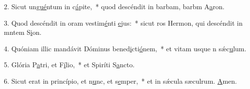 2. Sicut un\uline{gué}ntum in c\uline{á}pite,~* quod descéndit in barbam, barbm A\uline{a}ron.\par 
3. Quod descéndit in oram vestim\uline{é}nti \uline{e}jus:~* sicut ros Hermon, qui descéndit in mntem S\uline{i}on.\par 
4. Quóniam illic mandávit Dóminus bened\uline{i}cti\uline{ó}nem,~* et vitam usque n sǽc\uline{u}lum.\par 
5. Glória P\uline{a}tri, et F\uline{í}lio,~* et Spiríti S\uline{a}ncto.\par 
6. Sicut erat in princípio, et n\uline{u}nc, et s\uline{e}mper,~* et in sǽcula sæculrum. \uline{A}men.\par 
